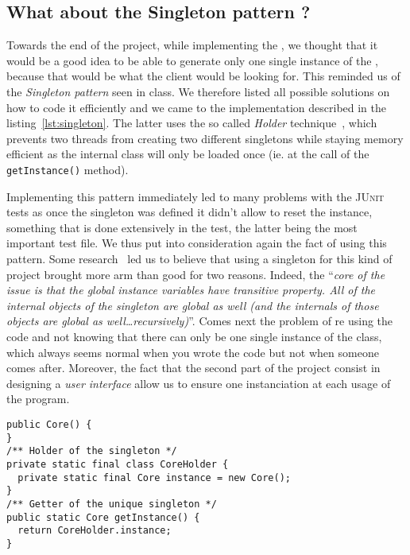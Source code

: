 \subsection{What about the Singleton pattern ?} %
\label{sub:what_about_the_singleton_pattern}
Towards the end of the project, while implementing the \Core,
we thought that it would be a good idea to be able
to generate only one single instance of the \Core,
because that would be what the client would be looking for.
This reminded us of the \emph{Singleton pattern} seen in class.
We therefore listed all possible solutions on how to code
it efficiently and we came to the implementation described
in the listing~\ref{lst:singleton}.
The latter uses the so called \emph{Holder} technique~\cite{goodSingleton},
which prevents two threads from creating two different singletons
while staying memory efficient as the internal class will only be
loaded once (ie. at the call of the \lstinline|getInstance()| method).

Implementing this pattern immediately led to many problems with
the \textsc{JUnit} tests as once the singleton was defined it
didn't allow to reset the instance, something that is done extensively
in the \Core test, the latter being the most important test file.
We thus put into consideration again the fact of using this pattern.
Some research~\cite{singletonLiars} led us to believe that using a singleton for this kind
of project brought more arm than good for two reasons.
Indeed, the ``\textit{core of the issue is that the global instance 
variables have transitive property. All of the internal objects of the 
singleton are global as well (and the internals of those objects are 
global as well\dots recursively)}''\cite{codeHardToTest}.
Comes next the problem of re using the code and not knowing that
there can only be one single instance of the \Core class,
which always seems normal when you wrote the code but not
when someone comes after.
Moreover, the fact that the second part of the project consist in
designing a \emph{user interface} allow us to ensure one instanciation
at each usage of the program.

\begin{lstlisting}[caption=How the implementation of the Singleton pattern
  would be.,
  label=lst:singleton] 
public Core() {
}
/** Holder of the singleton */
private static final class CoreHolder {		
  private static final Core instance = new Core();
}
/** Getter of the unique singleton */
public static Core getInstance() {
  return CoreHolder.instance;
}
\end{lstlisting}
  

